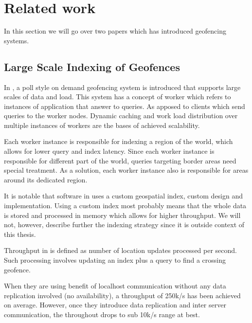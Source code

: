 \documentclass[a4]{report}
\begin{document}
        \section{Related work}
        In this section we will go over two papers which has introduced geofencing systems.

        \subsection{Large Scale Indexing of Geofences\cite{Cirillo-Jacobs-Martin-Szczytowski-2014}}
        In \cite{Cirillo-Jacobs-Martin-Szczytowski-2014}, a poll style on demand geofencing system is introduced that supports large scales
        of data and load.
        This system has a concept of worker which refers to instances of application that answer to queries.
        As apposed to clients which send queries to the worker nodes.
        Dynamic caching and work load distribution over multiple instances of workers are the bases of achieved
        scalability.

        Each worker instance is responsible for indexing a region of the world, which allows for lower query and index latency.
        Since each worker instance is responsible for different part of the world, queries targeting border areas need
        special treatment.
        As a solution, each worker instance also is responsible for areas around its dedicated region.

        It is notable that software in \cite{Cirillo-Jacobs-Martin-Szczytowski-2014} uses a custom geospatial index,
        custom design and implementation.
        Using a custom index most probably means that the whole data is stored and processed in memory which allows for higher throughput.
        We will not, however, describe further the indexing strategy since it is outside context of this thesis.

        Throughput in \cite{Cirillo-Jacobs-Martin-Szczytowski-2014} is defined as number of location updates processed per second.
        Such processing involves updating an index plus a query to find a crossing geofence.

        When they are using benefit of localhost communication without any data replication involved (no availability), a
        throughput of 250k/s has been achieved on average.
        However, once they introduce data replication and inter server communication, the throughout drops to sub 10k/s
        range at best.
\end{document}

